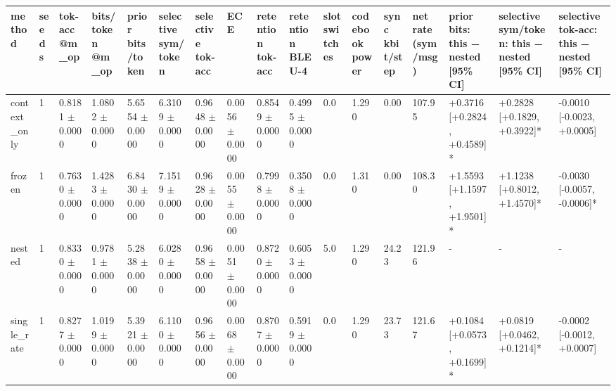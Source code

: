 \begin{tabular}{lllllllllllllllll}
\hline
method & seeds & tok-acc @m\_op & bits/token @m\_op & prior bits/token & selective sym/token & selective tok-acc & ECE & retention tok-acc & retention BLEU-4 & slot switches & codebook power & sync kbit/step & net rate (sym/msg) & prior bits: this − nested [95\% CI] & selective sym/token: this − nested [95\% CI] & selective tok-acc: this − nested [95\% CI] \\
\hline
context\_only & 1 & 0.8181 $\pm$ 0.0000 & 1.0802 $\pm$ 0.0000 & 5.6554 $\pm$ 0.0000 & 6.3109 $\pm$ 0.0000 & 0.9648 $\pm$ 0.0000 & 0.0056 $\pm$ 0.0000 & 0.8549 $\pm$ 0.0000 & 0.4995 $\pm$ 0.0000 & 0.0 & 1.290 & 0.00 & 107.95 & +0.3716 [+0.2824, +0.4589]* & +0.2828 [+0.1829, +0.3922]* & -0.0010 [-0.0023, +0.0005] \\
frozen & 1 & 0.7630 $\pm$ 0.0000 & 1.4283 $\pm$ 0.0000 & 6.8430 $\pm$ 0.0000 & 7.1519 $\pm$ 0.0000 & 0.9628 $\pm$ 0.0000 & 0.0055 $\pm$ 0.0000 & 0.7998 $\pm$ 0.0000 & 0.3508 $\pm$ 0.0000 & 0.0 & 1.310 & 0.00 & 108.30 & +1.5593 [+1.1597, +1.9501]* & +1.1238 [+0.8012, +1.4570]* & -0.0030 [-0.0057, -0.0006]* \\
nested & 1 & 0.8330 $\pm$ 0.0000 & 0.9781 $\pm$ 0.0000 & 5.2838 $\pm$ 0.0000 & 6.0280 $\pm$ 0.0000 & 0.9658 $\pm$ 0.0000 & 0.0051 $\pm$ 0.0000 & 0.8720 $\pm$ 0.0000 & 0.6053 $\pm$ 0.0000 & 5.0 & 1.290 & 24.23 & 121.96 & - & - & - \\
single\_rate & 1 & 0.8277 $\pm$ 0.0000 & 1.0199 $\pm$ 0.0000 & 5.3921 $\pm$ 0.0000 & 6.1100 $\pm$ 0.0000 & 0.9656 $\pm$ 0.0000 & 0.0068 $\pm$ 0.0000 & 0.8707 $\pm$ 0.0000 & 0.5919 $\pm$ 0.0000 & 0.0 & 1.290 & 23.73 & 121.67 & +0.1084 [+0.0573, +0.1699]* & +0.0819 [+0.0462, +0.1214]* & -0.0002 [-0.0012, +0.0007] \\
\hline
\end{tabular}
